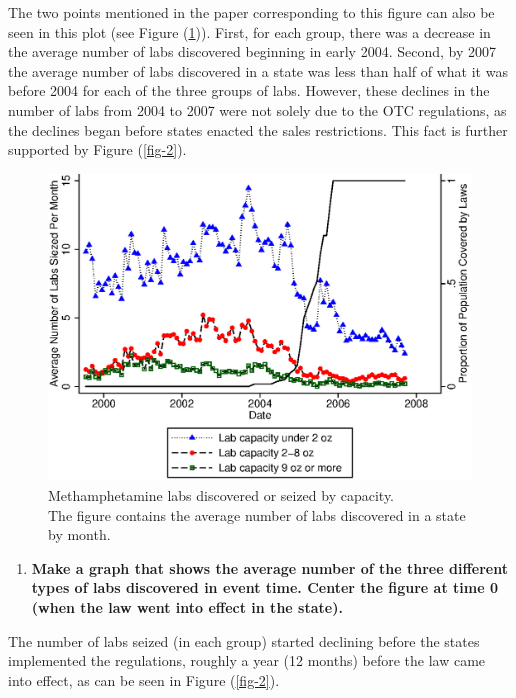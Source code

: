 \documentclass[
  11pt,
]{article}
\providecommand{\tightlist}{%
  \setlength{\itemsep}{0pt}\setlength{\parskip}{0pt}}
\begin{document}
The two points mentioned in the paper corresponding to this figure can
also be seen in this plot (see Figure (\ref{fig-1})). First, for each
group, there was a decrease in the average number of labs discovered
beginning in early 2004. Second, by 2007 the average number of labs
discovered in a state was less than half of what it was before 2004 for
each of the three groups of labs. However, these declines in the number
of labs from 2004 to 2007 were not solely due to the OTC regulations, as
the declines began before states enacted the sales restrictions. This
fact is further supported by Figure (\ref{fig-2}).

\begin{figure}[H]
 \centering
 \includegraphics{number_of_labs_siezed-timeseries.eps}
 \caption{Methamphetamine labs discovered or seized by capacity. \\ The
figure contains the average number of labs discovered in a state by
month.}
\label{fig-1}
\end{figure}

\begin{enumerate}
\def\labelenumi{(\alph{enumi})}
\setcounter{enumi}{1}
\tightlist
\item
  \textbf{Make a graph that shows the average number of the three
  different types of labs discovered in event time. Center the figure at
  time 0 (when the law went into effect in the state).}
\end{enumerate}

The number of labs seized (in each group) started declining before the
states implemented the regulations, roughly a year (12 months) before
the law came into effect, as can be seen in Figure (\ref{fig-2}).
\end{document}
